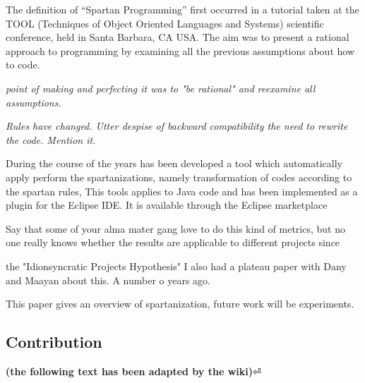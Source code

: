
The definition of ``Spartan Programming'' first occurred in a tutorial taken at 
the TOOL (Techniques of Object Oriented Languages and Systems) scientific conference, 
held in Santa Barbara, CA USA. %
The aim was to present a rational approach to programming by examining all the previous 
assumptions about how to code.

\emph{point of making and perfecting it was to "be rational" and
reexamine all assumptions.}

\emph{Rules have changed.
Utter despise of backward compatibility the need to rewrite the code.
Mention it.} 


During the course of the years has been developed a tool which automatically apply 
perform the spartanizations, namely transformation of codes according to the spartan rules,
This tools applies to Java code and has been implemented as a plugin for the Eclipse 
IDE. It is available through the Eclipse marketplace

Say that some of your alma mater gang love to do this kind of metrics, but
no one really knows whether the results are applicable to different projects
since \cite{Turnu:Concas:Marchesi:Tonelli:11}

the "Idionsyncratic Projects Hypothesis" I also had a plateau paper with
Dany and Maayan about this. A number o years ago.

This paper gives an overview of spartanization, future work will be
experiments.

\subsection{Contribution}

\textbf{(the following text has been adapted by the wiki)}⏎



